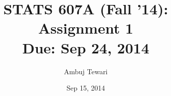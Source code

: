 \usepackage{fullpage}
\usepackage{amsmath,amssymb,amsthm}
\usepackage{url}
\usepackage[colorlinks=true]{hyperref}

\author{Ambuj Tewari}
\title{STATS 607A (Fall '14): Assignment 1\\
Due: Sep 24, 2014}
\date{Sep 15, 2014}
